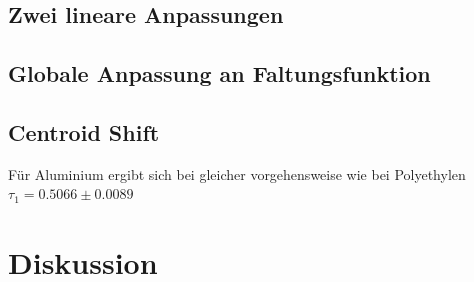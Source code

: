 \documentclass[a4paper,12pt]{article}
\begin{document}
\subsection{Zwei lineare Anpassungen}

\subsection{Globale Anpassung an Faltungsfunktion}

\subsection{Centroid Shift}
Für Aluminium ergibt sich bei gleicher vorgehensweise wie bei Polyethylen $τ_1 = 0.5066 \pm 0.0089$ 
\section{Diskussion}



{}
\end{document}
